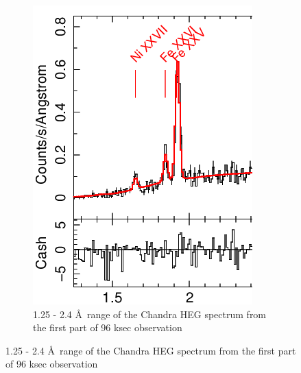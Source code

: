 \begin{figure}[h!]
\begin{subfigure}[t]{.3\textwidth}
        \includegraphics[width=\linewidth]{Chapters/Figures/long0_pheno_part.png}
        \caption{1.25 - 2.4 \AA\ range of the Chandra HEG spectrum from the first part of 96 ksec observation}
        \label{longportion}
    \end{subfigure}
    \label{portion}
\end{figure}


